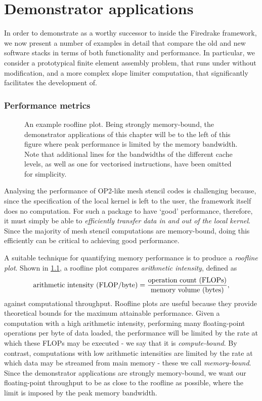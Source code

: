 \documentclass[thesis]{subfiles}
\begin{document}
\chapter{Demonstrator applications}
\label{chapter:demonstrator_applications}

In order to demonstrate  as a worthy successor to  inside the Firedrake framework, we now present a number of examples in detail that compare the old and new software stacks in terms of both functionality and performance.
In particular, we consider a prototypical finite element assembly problem, that runs under  without modification, and a more complex slope limiter computation, that  significantly facilitates the development of.

\subsection{Performance metrics}

\begin{figure}
  \centering
  
  \caption{
    An example roofline plot.
    Being strongly memory-bound, the demonstrator applications of this chapter will be to the left of this figure where peak performance is limited by the memory bandwidth.
    Note that additional lines for the bandwidths of the different cache levels, as well as one for vectorised instructions, have been omitted for simplicity.
  }
  \label{fig:roofline}
\end{figure}

Analysing the performance of OP2-like mesh stencil codes is challenging because, since the specification of the local kernel is left to the user, the framework itself does no computation.
For such a package to have `good' performance, therefore, it must simply be able to \emph{efficiently transfer data in and out of the local kernel}.
Since the majority of mesh stencil computations are memory-bound, doing this efficiently can be critical to achieving good performance.

A suitable technique for quantifying memory performance is to produce a \emph{roofline plot}.
Shown in \cref{fig:roofline}, a roofline plot compares \emph{arithmetic intensity}, defined as
\begin{equation*}
  \textnormal{arithmetic intensity (FLOP/byte)} = \frac{\textnormal{operation count (FLOPs)}}{\textnormal{memory volume (bytes)}},
\end{equation*}
against computational throughput.
Roofline plots are useful because they provide theoretical bounds for the maximum attainable performance.
Given a computation with a high arithmetic intensity, performing many floating-point operations per byte of data loaded, the performance will be limited by the rate at which these FLOPs may be executed - we say that it is \emph{compute-bound}.
By contrast, computations with low arithmetic intensities are limited by the rate at which data may be streamed from main memory - these we call \emph{memory-bound}.
Since the demonstrator applications are strongly memory-bound, we want our floating-point throughput to be as close to the roofline as possible, where the limit is imposed by the peak memory bandwidth.
\end{document}
